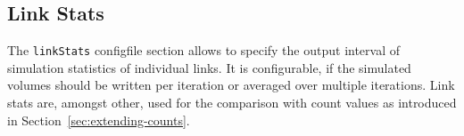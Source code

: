 \subsection{Link Stats}
\label{sec:linkStats}
The \lstinline|linkStats| \gls{configfile} section allows to specify the output interval of simulation statistics of individual links. It is configurable, if the simulated volumes should be written per iteration or averaged over multiple iterations. Link stats are, amongst other, used for the comparison with count values as introduced in Section~\ref{sec:extending-counts}. 

